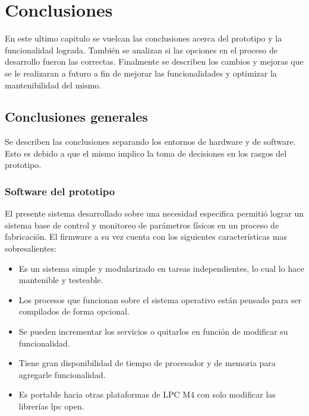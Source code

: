 \chapter{ Conclusiones }
\label{Chapter5} 
En este ultimo capitulo se vuelcan las conclusiones acerca del prototipo y la funcionalidad lograda. También se analizan si las opciones en el proceso de desarrollo fueron las correctas. Finalmente se describen los cambios y mejoras que se le realizaran a futuro a fin de mejorar las funcionalidades y optimizar la mantenibilidad del mismo. 

\section{ Conclusiones generales }

Se describen las conclusiones separando los entornos de hardware y de software. Esto es debido a que el mismo implico la toma de decisiones en los rasgos del prototipo. 

\subsection{ Software del prototipo }
El presente sistema desarrollado sobre una necesidad especifica permitió lograr un sistema base de control y monitoreo de parámetros físicos en un proceso de fabricación. El firmware a su vez cuenta con los siguientes características mas sobresalientes:
\begin{itemize}
\item Es un sistema simple y modularizado en tareas independientes, lo cual lo hace mantenible y testeable.
\item Los procesos que funcionan sobre el sistema operativo están pensado para ser compilados de forma opcional.
\item Se pueden incrementar los servicios o quitarlos en función de modificar su funcionalidad.
\item Tiene gran disponibilidad de tiempo de procesador y de memoria para agregarle funcionalidad.
\item Es portable hacia otras plataformas de LPC M4 con solo modificar las librerías lpc open.
\end{itemize}

